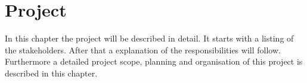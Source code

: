 \chapter{Project}
In this chapter the project will be described in detail. It starts with a listing of the
stakeholders. After that a explanation of the responsibilities will follow. Furthermore 
a detailed project scope, planning and organisation of this project is described in this chapter.

